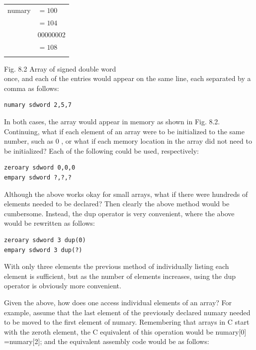 \documentclass[10pt]{book}
\begin{document}
\begin{center}
\begin{tabular}{rl|}
numary & $=100$ \\
 & $=104$ \\
 & 00000002 \\
 & $=108$ \\
 &  \\
\end{tabular}
\end{center}

Fig. 8.2 Array of signed double word\\
once, and each of the entries would appear on the same line, each separated by a comma as follows:


\begin{verbatim}
numary sdword 2,5,7
\end{verbatim}

In both cases, the array would appear in memory as shown in Fig. 8.2.\\
Continuing, what if each element of an array were to be initialized to the same number, such as 0 , or what if each memory location in the array did not need to be initialized? Each of the following could be used, respectively:

\begin{verbatim}
zeroary sdword 0,0,0
empary sdword ?,?,?
\end{verbatim}

Although the above works okay for small arrays, what if there were hundreds of elements needed to be declared? Then clearly the above method would be cumbersome. Instead, the dup operator is very convenient, where the above would be rewritten as follows:

\begin{verbatim}
zeroary sdword 3 dup(0)
empary sdword 3 dup(?)
\end{verbatim}

With only three elements the previous method of individually listing each element is sufficient, but as the number of elements increases, using the dup operator is obviously more convenient.

Given the above, how does one access individual elements of an array? For example, assume that the last element of the previously declared numary needed to be moved to the first element of numary. Remembering that arrays in C start with the zeroth element, the C equivalent of this operation would be numary[0] =numary[2]; and the equivalent assembly code would be as follows:
\end{document}
